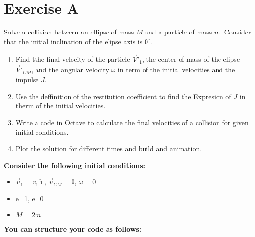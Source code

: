 \documentclass[12pt]{article}
\begin{document}
\vspace{10mm}

\section*{Exercise A}

Solve a collision between an ellipse of mass $M$ and a particle of mass $m$. 
Consider that the initial inclination of the elipse axis is $0^{\circ}$.


\vspace{10mm}

\begin{enumerate}
\item Find tthe final velocity of the particle $\vec{V}'_1$,
the center of mass of the elipse $\vec{V}'_{CM}$, and the angular velocity $\omega$ in term of 
the initial velocities and the impulse $J$.
\vspace{3mm}
\item Use the deffinition of the restitution coefficient to find the Expresion of $J$ in therm 
of the initial velocities.
\vspace{3mm}
\item Write a code in Octave to calculate the final velocities of a collision for  given initial
conditions.
\vspace{3mm}
\item Plot the solution for different times and build and animation.
\end{enumerate}

\vspace{5mm}

\textbf{Consider the following initial conditions:}

\vspace{3mm}

\begin{itemize}
\item $\vec{v}_1=v_1\hat{\imath}$, $\vec{v}_{CM}=0$, $\omega=0$
\item e=1, e=0
\item  $M=2m$
\end{itemize}

\vspace{5mm}

\textbf{You can structure your code as follows:}
\end{document}
